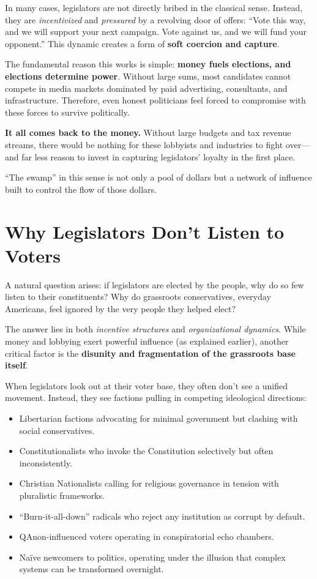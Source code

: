 In many cases, legislators are not directly bribed in the classical sense. Instead, they are \emph{incentivized} and \emph{pressured} by a revolving door of offers: ``Vote this way, and we will support your next campaign. Vote against us, and we will fund your opponent.'' This dynamic creates a form of \textbf{soft coercion and capture}.

The fundamental reason this works is simple: \textbf{money fuels elections, and elections determine power}. Without large sums, most candidates cannot compete in media markets dominated by paid advertising, consultants, and infrastructure. Therefore, even honest politicians feel forced to compromise with these forces to survive politically.

\textbf{It all comes back to the money.} Without large budgets and tax revenue streams, there would be nothing for these lobbyists and industries to fight over—and far less reason to invest in capturing legislators' loyalty in the first place.

``The swamp'' in this sense is not only a pool of dollars but a network of influence built to control the flow of those dollars.


\section{Why Legislators Don’t Listen to Voters}

A natural question arises: if legislators are elected by the people, why do so few listen to their constituents? Why do grassroots conservatives, everyday Americans, feel ignored by the very people they helped elect?

The answer lies in both \emph{incentive structures} and \emph{organizational dynamics}. While money and lobbying exert powerful influence (as explained earlier), another critical factor is the \textbf{disunity and fragmentation of the grassroots base itself}.

When legislators look out at their voter base, they often don’t see a unified movement. Instead, they see factions pulling in competing ideological directions:

\begin{itemize}
    \item Libertarian factions advocating for minimal government but clashing with social conservatives.
    \item Constitutionalists who invoke the Constitution selectively but often inconsistently.
    \item Christian Nationalists calling for religious governance in tension with pluralistic frameworks.
    \item “Burn-it-all-down” radicals who reject any institution as corrupt by default.
    \item QAnon-influenced voters operating in conspiratorial echo chambers.
    \item Naïve newcomers to politics, operating under the illusion that complex systems can be transformed overnight.
\end{itemize}

